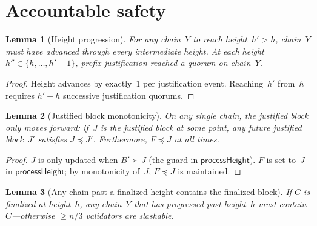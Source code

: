 \ifx\litemode\undefined\documentclass{article}\fi
\theoremstyle{plain}
\newtheorem{lemma}{Lemma}
\theoremstyle{definition}
\theoremstyle{remark}
\begin{document}
\section{Accountable safety}

\begin{lemma}[Height progression]\label{lem:heightprog}
For any chain~$Y$ to reach height~$h' > h$, chain~$Y$ must have advanced through every intermediate height.
At each height $h'' \in \{h, \ldots, h'-1\}$, prefix justification reached a quorum on chain~$Y$.
\end{lemma}

\begin{proof}
Height advances by exactly~$1$ per justification event.
Reaching~$h'$ from~$h$ requires $h' - h$ successive justification quorums.
\end{proof}

\begin{lemma}[Justified block monotonicity]\label{lem:slotmono}
On any single chain, the justified block only moves forward: if~$J$ is the justified block at some point, any future justified block~$J'$ satisfies $J \preceq J'$.
Furthermore, $F \preceq J$ at all times.
\end{lemma}

\begin{proof}
$J$ is only updated when $B' \succ J$ (the guard in $\textsf{processHeight}$).
$F$ is set to~$J$ in $\textsf{processHeight}$; by monotonicity of~$J$, $F \preceq J$ is maintained.
\end{proof}

\begin{lemma}[Any chain past a finalized height contains the finalized block]\label{lem:mainsafety}
If $C$ is finalized at height~$h$, any chain~$Y$ that has progressed past height~$h$ must contain~$C$---otherwise $\geq n/3$ validators are slashable.
\end{lemma}
\end{document}
